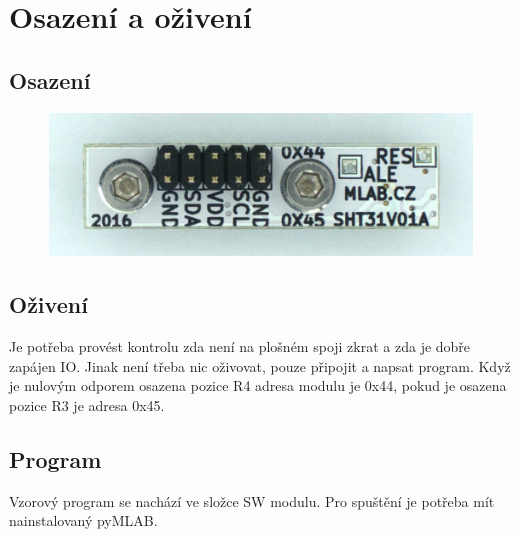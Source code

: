 \documentclass[12pt,a4paper]{article}
\begin{document}
\newpage

\section{Osazení a oživení}\label{osazenuxed-a-oux17eivenuxed}

\subsection{Osazení}\label{osazenuxed}

\begin{figure}[htbp]
\centering
\includegraphics{DOC/SRC/img/SHT31V01A_top_big.jpg}
\caption{}
\end{figure}

\subsection{Oživení}\label{oux17eivenuxed}

Je potřeba provést kontrolu zda není na plošném spoji zkrat a zda je
dobře zapájen IO. Jinak není třeba nic oživovat, pouze připojit a napsat
program. Když je nulovým odporem osazena pozice R4 adresa modulu je
0x44, pokud je osazena pozice R3 je adresa 0x45.

\subsection{Program}\label{program}

Vzorový program se nachází ve složce SW modulu. Pro spuštění je potřeba
mít nainstalovaný pyMLAB.
\end{document}
